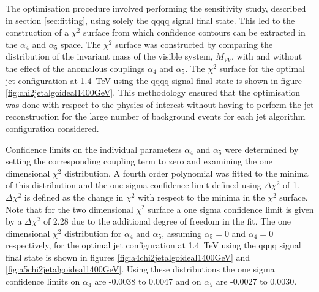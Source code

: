 The optimisation procedure involved performing the sensitivity study, described in section \ref{sec:fitting}, using solely the {\nu}{\nu}qqqq signal final state.  This led to the construction of a $\chi^{2}$ surface from which confidence contours can be extracted in the $\alpha_{4}$ and $\alpha_{5}$ space.  The $\chi^{2}$ surface was constructed by comparing the distribution of the invariant mass of the visible system, $M_{VV}$, with and without the effect of the anomalous couplings $\alpha_{4}$ and $\alpha_{5}$.  The $\chi^{2}$ surface for the optimal jet configuration at 1.4~TeV using the {\nu}{\nu}qqqq signal final state is shown in figure \ref{fig:chi2jetalgoideal1400GeV}.  This methodology ensured that the optimisation was done with respect to the physics of interest without having to perform the jet reconstruction for the large number of background events for each jet algorithm configuration considered.  

Confidence limits on the individual parameters $\alpha_{4}$ and $\alpha_{5}$ were determined by setting the corresponding coupling term to zero and examining the one dimensional $\chi^{2}$ distribution.  A fourth order polynomial was fitted to the minima of this distribution and the one sigma confidence limit defined using $\Delta\chi^{2}$ of 1.  $\Delta\chi^{2}$ is defined as the change in $\chi^{2}$ with respect to the minima in the $\chi^{2}$ surface.  Note that for the two dimensional $\chi^{2}$ surface a one sigma confidence limit is given by a $\Delta\chi^{2}$ of 2.28 due to the additional degree of freedom in the fit.  The one dimensional $\chi^{2}$ distribution for $\alpha_{4}$ and $\alpha_{5}$, assuming $\alpha_{5} = 0$ and $\alpha_{4} = 0$ respectively, for the optimal jet configuration at 1.4~TeV using the {\nu}{\nu}qqqq signal final state is shown in figures \ref{fig:a4chi2jetalgoideal1400GeV} and \ref{fig:a5chi2jetalgoideal1400GeV}.  Using these distributions the one sigma confidence limits on $\alpha_{4}$ are -0.0038 to 0.0047 and on $\alpha_{5}$ are -0.0027 to 0.0030.

